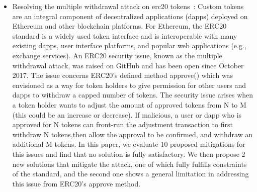 \begin{itemize}
    \item{Resolving the multiple withdrawal attack on erc20 tokens~\cite{rahimian2019resolving}:} Custom tokens are an integral component of decentralized applications (dapps) deployed on Ethereum and other blockchain platforms. For Ethereum, the ERC20 standard is a widely used token interface and is interoperable with many existing dapps, user interface platforms, and popular web applications (e.g., exchange services). An ERC20 security issue, known as the multiple withdrawal attack, was raised on GitHub and has been open since October 2017. The issue concerns ERC20's defined method approve() which was envisioned as a way for token holders to give permission for other users and dapps to withdraw a capped number of tokens. The security issue arises when a token holder wants to adjust the amount of approved tokens from N to M (this could be an increase or decrease). If malicious, a user or dapp who is approved for N tokens can front-run the adjustment transaction to first withdraw N tokens,then allow the approval to be confirmed, and withdraw an additional M tokens. In this paper, we evaluate 10 proposed mitigations for this issues and find that no solution is fully satisfactory. We then propose 2 new solutions that mitigate the attack, one of which fully fulfills constraints of the standard, and the second one shows a general limitation in addressing this issue from ERC20’s approve method.

\end{itemize}
